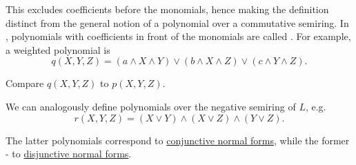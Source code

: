 \begin{remark}
  This excludes coefficients before the monomials, hence making the definition distinct from the general notion of a polynomial over a commutative semiring. In \cite{Marichal2007}, polynomials with coefficients in front of the monomials are called . For example, a weighted polynomial is
  \begin{equation*}
    q(X, Y, Z) = (a \wedge X \wedge Y) \vee (b \wedge X \wedge Z) \vee (c \wedge Y \wedge Z).
  \end{equation*}

  Compare \( q(X, Y, Z) \) to \( p(X, Y, Z) \).

  We can analogously define polynomials over the negative semiring of \( L \), e.g.
  \begin{equation*}
    r(X, Y, Z) = (X \vee Y) \wedge (X \vee Z) \wedge (Y \vee Z).
  \end{equation*}

  The latter polynomials correspond to \hyperref[def:conjunctive_disjunctive_normal_form/normal_form]{conjunctive normal forms}, while the former - to \hyperref[def:conjunctive_disjunctive_normal_form/normal_form]{disjunctive normal forms}.
\end{remark}

